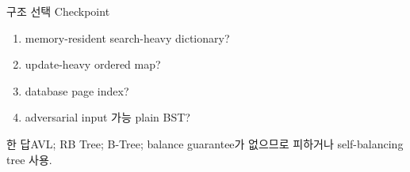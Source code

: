 \begin{frame}{구조 선택 Checkpoint}
\begin{enumerate}\item memory-resident search-heavy dictionary?\item update-heavy ordered map?\item database page index?\item adversarial input 가능 plain BST?\end{enumerate}
\begin{exampleblock}{한 답}AVL; RB Tree; B-Tree; balance guarantee가 없으므로 피하거나 self-balancing tree 사용.\end{exampleblock}
\end{frame}
